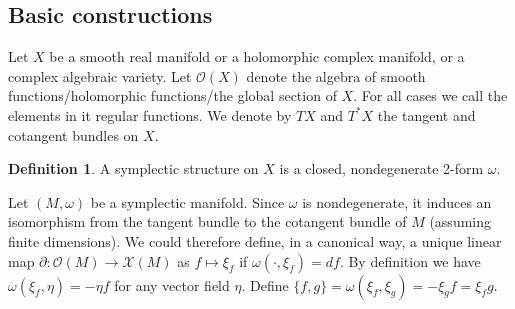 \documentclass[12pt]{report}
\theoremstyle{remark}
\theoremstyle{definition}
\newtheorem{definition}{Definition}[section]
\newcommand{\w}[0]{\omega}
\begin{document}
    \subsection{Basic constructions}
    Let $X$ be a smooth real manifold or a holomorphic complex manifold, or a complex algebraic variety. Let $\mathcal O(X)$ denote the algebra of smooth functions/holomorphic functions/the global section of $X$. For all cases we call the elements in it regular functions. We denote by $TX$ and $T^*X$ the tangent and cotangent bundles on $X$.
    \begin{definition}
        A symplectic structure on $X$ is a closed, nondegenerate 2-form $\w$.
    \end{definition}
    Let $(M, \w)$ be a symplectic manifold. Since $\w$ is nondegenerate, it induces an isomorphism from the tangent bundle to the cotangent bundle of $M$ (assuming finite dimensions). We could therefore define, in a canonical way, a unique linear map $\partial:\mathcal O(M)\to \mathscr{X}(M)$ as $f\mapsto \xi_f$ if $\w(\cdot, \xi_f)=df$. By definition we have $\w(\xi_f,\eta)=-\eta f$ for any vector field $\eta$. Define $\{f, g\}=\w(\xi_f,\xi_g)=-\xi_gf=\xi_fg$.
    
\end{document}
